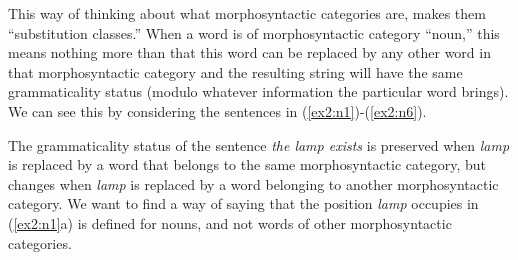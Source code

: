 This way of thinking about what morphosyntactic categories are, makes them ``substitution classes.'' When a word is of morphosyntactic category ``noun,'' this means nothing more than that this word can be replaced by any other word in that morphosyntactic category and the resulting string will have the same grammaticality status (modulo whatever information the particular word brings). We can see this by considering  the sentences in (\ref{ex2:n1})-(\ref{ex2:n6}).
\begin{exe}
\ex \label{ex2:n1} 
\begin{xlist}
\end{xlist}
\ex \label{ex2:n2}
\begin{xlist}
\end{xlist}
\ex \label{ex2:n3}
\begin{xlist}
\end{xlist}
\pagebreak
\ex \label{ex2:n4}
\begin{xlist}
\end{xlist}
\ex \label{ex2:n5}
\begin{xlist}
\end{xlist}
\ex \label{ex2:n6}
\begin{xlist}
\end{xlist}
\end{exe}
The grammaticality status of the sentence \emph{the lamp exists} is preserved when \emph{lamp} is replaced by a word that belongs to the same morphosyntactic category, but changes when \emph{lamp} is replaced by a word belonging to another morphosyntactic category. We want to find a way of saying that the position \emph{lamp} occupies in (\ref{ex2:n1}a) is defined for nouns, and not words of other morphosyntactic categories. 

